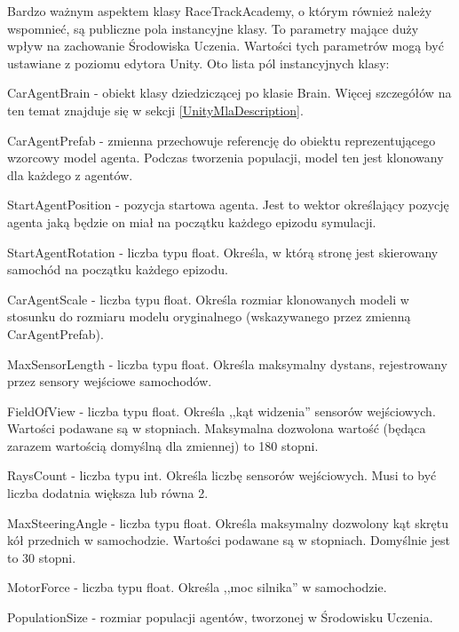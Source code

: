 Bardzo ważnym aspektem klasy RaceTrackAcademy, o którym również należy wspomnieć, są publiczne pola instancyjne klasy. 
To parametry mające duży wpływ na zachowanie Środowiska Uczenia. Wartości tych parametrów mogą być ustawiane z poziomu edytora Unity.
Oto lista pól instancyjnych klasy:
\begin{itemize*}
\item CarAgentBrain - obiekt klasy dziedziczącej po klasie Brain. Więcej szczegółów na ten temat znajduje się w sekcji \ref{UnityMlaDescription}.
\item CarAgentPrefab - zmienna przechowuje referencję do obiektu reprezentującego wzorcowy model agenta. Podczas tworzenia populacji, model ten jest klonowany dla każdego z agentów.
\item StartAgentPosition - pozycja startowa agenta. Jest to wektor określający pozycję agenta jaką będzie on miał na początku każdego epizodu symulacji.
\item StartAgentRotation - liczba typu float. Określa, w którą stronę jest skierowany samochód na początku każdego epizodu.
\item CarAgentScale - liczba typu float. Określa rozmiar klonowanych modeli w stosunku do rozmiaru modelu oryginalnego (wskazywanego przez zmienną CarAgentPrefab).
\item MaxSensorLength - liczba typu float. Określa maksymalny dystans, rejestrowany przez sensory wejściowe samochodów.
\item FieldOfView - liczba typu float. Określa ,,kąt widzenia'' sensorów wejściowych. Wartości podawane są w stopniach. Maksymalna dozwolona wartość (będąca zarazem wartością domyślną dla zmiennej) to 180 stopni.
\item RaysCount - liczba typu int. Określa liczbę sensorów wejściowych. Musi to być liczba dodatnia większa lub równa 2.
\item MaxSteeringAngle - liczba typu float. Określa maksymalny dozwolony kąt skrętu kół przednich w samochodzie. Wartości podawane są w stopniach. Domyślnie jest to 30 stopni.
\item MotorForce - liczba typu float. Określa ,,moc silnika'' w samochodzie.
\item PopulationSize - rozmiar populacji agentów, tworzonej w Środowisku Uczenia.
\end{itemize*}

